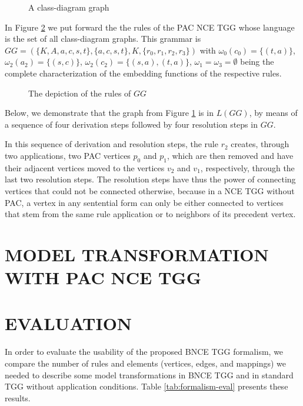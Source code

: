 \documentclass[a4paper,twoside]{article}
\begin{document}
\begin{figure}[h]
	\centering
	
	\caption{A class-diagram graph}
	\label{fig:classdiagram-g}
\end{figure}
 
In Figure \ref{fig:classdiagram-gg} we put forward the the rules of the PAC NCE TGG whose language is the set of all class-diagram graphs. This grammar is $GG = (\{K, A, a, c, s, t\}, \{a, c, s, t\}, K, \{r_0, r_1, r_2, r_3\})$ with $\omega_0(c_0) = \{(t,a)\}$, $\omega_2(a_2) = \{(s,c)\}$, $\omega_2(c_2) = \{(s,a),(t,a)\}$, $\omega_1 = \omega_3 = \emptyset$ being the complete characterization of the embedding functions of the respective rules.

\begin{figure}
	\centering
	
	\caption{The depiction of the rules of $GG$}
	\label{fig:classdiagram-gg}
\end{figure}

Below, we demonstrate that the graph from Figure \ref{fig:classdiagram-g} is in $L(GG)$, by means of a sequence of four derivation steps followed by four resolution steps in $GG$.


In this sequence of derivation and resolution steps, the rule $r_2$ creates, through two applications, two PAC vertices $p_0$ and $p_1$, which are then removed and have their adjacent vertices moved to the vertices $v_2$ and $v_1$, respectively, through the last two resolution steps. The resolution steps have thus the power of connecting vertices that could not be connected otherwise, because in a NCE TGG without PAC, a vertex in any sentential form can only be either connected to vertices that stem from the same rule application or to neighbors of its precedent vertex.

\section{\uppercase{Model Transformation with PAC NCE TGG}}

\noindent

\section{\uppercase{Evaluation}}

\noindent In order to evaluate the usability of the proposed BNCE TGG formalism, we compare the number of rules and elements (vertices, edges, and mappings) we needed to describe some model transformations in BNCE TGG and in standard TGG without application conditions. Table \ref{tab:formalism-eval} presents these results.
\end{document}
